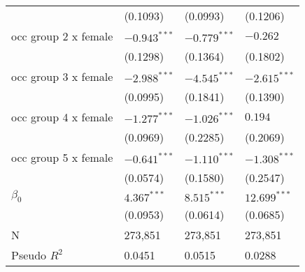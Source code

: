 \begin{tabular}{llll}
                                       &           (0.1093) &           (0.0993) &           (0.1206) \\
occ group 2 x female                   &     $-0.943^{***}$ &     $-0.779^{***}$ &           $-0.262$ \\
                                       &           (0.1298) &           (0.1364) &           (0.1802) \\
occ group 3 x female                   &     $-2.988^{***}$ &     $-4.545^{***}$ &     $-2.615^{***}$ \\
                                       &           (0.0995) &           (0.1841) &           (0.1390) \\
occ group 4 x female                   &     $-1.277^{***}$ &     $-1.026^{***}$ &            $0.194$ \\
                                       &           (0.0969) &           (0.2285) &           (0.2069) \\
occ group 5 x female                   &     $-0.641^{***}$ &     $-1.110^{***}$ &     $-1.308^{***}$ \\
                                       &           (0.0574) &           (0.1580) &           (0.2547) \\
$\beta_0$                              &      $4.367^{***}$ &      $8.515^{***}$ &     $12.699^{***}$ \\
                                       &           (0.0953) &           (0.0614) &           (0.0685) \\
\midrule
N                                      &            273,851 &            273,851 &            273,851 \\
Pseudo $R^2$                           &             0.0451 &             0.0515 &             0.0288 \\
\bottomrule
\end{tabular}
